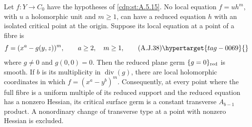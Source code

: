 
\begin{proposition}\hypertarget{tag-01B7}{}\label{cdp:st:A.5.17}


Let $f:Y\to C_0$ have the hypotheses of \ref{cdp:st:A.5.15}.
No local equation $f=u h^m$, with $u$ a holomorphic
unit and $m\ge1$, can have a reduced equation $h$
with an isolated critical point at the origin.
Suppose its local equation at a point of a fibre is
\[
             f=(x^a-g(y,z))^m,
             \qquad a\ge2,\quad m\ge1,             \tag{A.J.38}\hypertarget{tag-0069}{}\label{cdp:eq:A.J.38}
\]
where $g\ne0$ and $g(0,0)=0$. Then the reduced
plane germ $\{g=0\}_{\rm red}$ is smooth. If
$b$ is its multiplicity in $\operatorname{div}(g)$,
there are local holomorphic coordinates in which
$f=(x^a-y^b)^m$.
Consequently, at every point where the full fibre
is a uniform multiple of its reduced support and
the reduced equation has a nonzero Hessian, its
critical surface germ is a constant
transverse $A_{b-1}$ product. A nonordinary change
of transverse type at a point with nonzero Hessian
is excluded.
\end{proposition}

